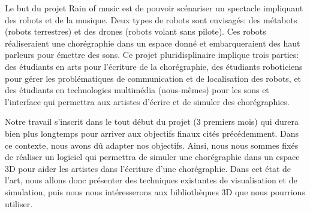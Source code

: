 Le but du projet Rain of music est de pouvoir scénariser un spectacle impliquant des robots et de la musique. Deux types de robots sont envisagés: des métabots (robots terrestres) et des drones (robots volant sans pilote). Ces robots réaliseraient une chorégraphie dans un espace donné et embarqueraient des haut parleurs pour émettre des sons. Ce projet pluridisplinaire implique trois parties: des étudiants en arts pour l'écriture de la chorégraphie, des étudiants roboticiens pour gérer les problématiques de communication et de localisation des robots, et des étudiants en technologies multimédia (nous-mêmes) pour les sons et l'interface qui permettra aux artistes d'écrire et de simuler des chorégraphies.

Notre travail s'inscrit dans le tout début du projet (3 premiers mois) qui durera bien plus longtemps pour arriver aux objectifs finaux cités précédemment. Dans ce contexte, nous avons dû adapter nos objectifs. Ainsi, nous nous sommes fixés de réaliser un logiciel qui permettra de simuler une chorégraphie dans un espace 3D pour aider les artistes dans l'écriture d'une chorégraphie. Dans cet état de l'art, nous allons donc présenter des techniques existantes de visualisation et de simulation, puis nous nous intéresserons aux bibliothèques 3D que nous pourrions utiliser.
